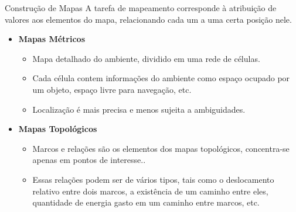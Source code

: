 \documentclass{beamer}
\newlength{\wideitemsep}
\let\olditem\item
\renewcommand{\item}{\setlength{\itemsep}{\wideitemsep}\olditem}
\begin{document}
\begin{frame}{Construção de Mapas}
A tarefa de mapeamento corresponde à atribuição de valores aos elementos do mapa, relacionando cada um a uma certa 
posição nele.
\begin{itemize}
 \item \textbf{Mapas Métricos}
    \begin{itemize}
    \item Mapa detalhado do ambiente, dividido em uma rede de células.
    \item Cada célula contem informações do ambiente como espaço ocupado por um objeto, 
    espaço livre para navegação, etc.
    \item Localização é mais precisa e menos sujeita a ambiguidades.
    \end{itemize}

 \item \textbf{Mapas Topológicos}
      \begin{itemize}
    \item  Marcos e relações são os elementos dos mapas topológicos, concentra-se apenas em pontos de interesse..
    \item Essas relações podem ser de vários tipos, tais como o deslocamento
relativo entre dois marcos, a existência de um caminho entre eles,
quantidade de energia gasto em um caminho entre marcos, etc.
    \end{itemize}
\end{itemize}
\end{frame}

\end{document}
